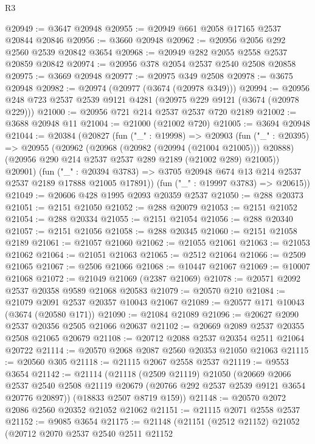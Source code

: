\begin{lexlean}{R3}
\begin{coremodule}
@20949 := @3647 @20948
@20955 := @20949 @661 @2058 @17165 @2537 @20844 @20846
@20956 := @3660 @20948
@20962 := @20956 @2056 @292 @2560 @2539 @20842 @3654
@20968 := @20949 @282 @2055 @2558 @2537 @20859 @20842
@20974 := @20956 @378 @2054 @2537 @2540 @2508 @20858
@20975 := @3669 @20948
@20977 := @20975 @349 @2508
@20978 := @3675 @20948
@20982 := @20974 (@20977 (@3674 (@20978 @349)))
@20994 := @20956 @248 @723 @2537 @2539 @9121 @4281 (@20975 @229 @9121 (@3674 (@20978 @229)))
@21000 := @20956 @721 @214 @2537 @2537 @720 @2189
@21002 := @3688 @20948 @11
@21004 := @21000 (@21002 @720)
@21005 := @3694 @20948
@21044 := @20384
    (@20827
      (fun ("_" : @19998) =>
      @20903
        (fun ("_" : @20395) =>
        @20955
          (@20962
            (@20968 (@20982 (@20994 (@21004 @21005))) @20888)
            (@20956 @290 @214 @2537 @2537 @289 @2189 (@21002 @289) @21005))
          @20901)
        (fun ("_" : @20394 @3783) =>
        @3705 @20948 @674 @13 @214 @2537 @2537 @2189 @17888 @21005 @17891))
      (fun ("_" : @19997 @3783) => @20615))
@21049 := @20606 @428 @1995 @2093 @20359 @2537
@21050 := @288 @20373
@21051 := @2151 @21050
@21052 := @288 @20079
@21053 := @2151 @21052
@21054 := @288 @20334
@21055 := @2151 @21054
@21056 := @288 @20340
@21057 := @2151 @21056
@21058 := @288 @20345
@21060 := @2151 @21058 @2189
@21061 := @21057 @21060
@21062 := @21055 @21061
@21063 := @21053 @21062
@21064 := @21051 @21063
@21065 := @2512 @21064
@21066 := @2509 @21065
@21067 := @2506 @21066
@21068 := @10447 @21067
@21069 := @10007 @21068
@21072 := @21049 @21069 (@2387 @21069)
@21078 := @20571 @2092 @2537 @20358 @9589 @21068 @20583
@21079 := @20570 @210
@21084 := @21079 @2091 @2537 @20357 @10043 @21067
@21089 := @20577 @171 @10043 (@3674 (@20580 @171))
@21090 := @21084 @21089
@21096 := @20627 @2090 @2537 @20356 @2505 @21066 @20637
@21102 := @20669 @2089 @2537 @20355 @2508 @21065 @20679
@21108 := @20712 @2088 @2537 @20354 @2511 @21064 @20722
@21114 := @20570 @2068 @2087 @2560 @20353 @21050 @21063
@21115 := @20560 @305
@21118 := @21115 @2067 @2558 @2537
@21119 := @9553 @3654
@21142 := @21114
    (@21118
      (@2509 @21119)
      @21050
      (@20669
        @2066
        @2537
        @2540
        @2508
        @21119
        @20679
        (@20766 @292 @2537 @2539 @9121 @3654 @20776 @20897))
      (@18833 @2507 @8719 @159))
@21148 := @20570 @2072 @2086 @2560 @20352 @21052 @21062
@21151 := @21115 @2071 @2558 @2537
@21152 := @9085 @3654
@21175 := @21148
    (@21151
      (@2512 @21152)
      @21052
      (@20712
        @2070
        @2537
        @2540
        @2511
        @21152

\end{coremodule}
\end{lexlean}
